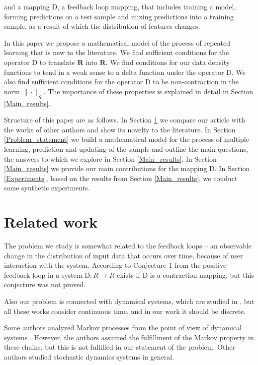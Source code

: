 \documentclass{article}
\begin{document}
    and a mapping $\text{D}$, a feedback loop mapping, that includes training a model, forming predictions on a test sample and mixing predictions into a training sample, as a result of which the distribution of features changes.

    In this paper we propose a mathematical model of the process of repeated learning that is new to the literature. We find sufficient conditions for the operator $\text{D}$ to translate $\mathbf{R}$ into $\mathbf{R}$. We find conditions for our data density functions to tend in a weak sense to a delta function under the operator $\text{D}$. We also find sufficient conditions for the operator $\text{D}$ to be non-contraction in the norm $\|\cdot \|_q$. The importance of these properties is explained in detail in Section \ref{Main_results}.
    
    Structure of this paper are as follows. In Section \ref{Related_work} we compare our article with the works of other authors and show its novelty to the literature. In Section \ref{Problem_statement} we build a mathematical model for the process of multiple learning, prediction and updating of the sample and outline the main questions, the answers to which we explore in Section \ref{Main_results}. In Section \ref{Main_results} we provide our main contributions for the mapping $\text{D}$. In Section \ref{Experiments}, based on the results from Section \ref{Main_results}, we conduct some synthetic experiments.

\section{Related work} \label{Related_work}    

    The problem we study is somewhat related to the feedback loops \cite{khritankov2021hidden, khritankov2021existence} -- an observable change in the distribution of input data that occurs over time, because of user interaction with the system. According to Conjecture 1 from \cite{khritankov2021hidden} the positive feedback loop in a system $\text{D} : R \rightarrow R$ exists if $\text{D}$ is a contraction mapping, but this conjecture was not proved.

    Also our problem is connected with dynamical systems, which are studied in \cite{katok1995introduction, nemytskii2015qualitative}, but all these works consider continuous time, and in our work it should be discrete.

    Some authors analyzed Markov processes from the point of view of dynamical systems \cite{tarlowski2017global, vershik2005does}. However, the authors assumed the fulfillment of the Markov property in these chains, but this is not fulfilled in our statement of the problem. Other authors \cite{varvenne2019rate, pap1996fixed} studied stochastic dynamics systems in general.
\end{document}
